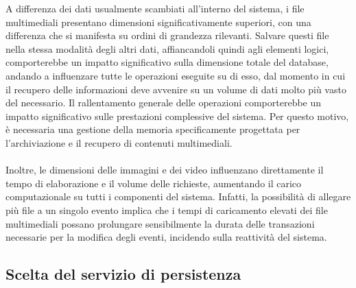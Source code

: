 A differenza dei dati usualmente scambiati all'interno del sistema, 
i file multimediali presentano dimensioni significativamente superiori, 
con una differenza che si manifesta su ordini di grandezza rilevanti. 
Salvare questi file nella stessa modalità degli altri dati, 
affiancandoli quindi agli elementi logici, 
comporterebbe un impatto significativo sulla dimensione totale del database,
andando a influenzare tutte le operazioni eseguite su di esso,
dal momento in cui il recupero delle informazioni deve avvenire
su un volume di dati molto più vasto del necessario.
Il rallentamento generale delle operazioni comporterebbe
un impatto significativo sulle prestazioni complessive del sistema.
Per questo motivo, è necessaria una gestione della memoria 
specificamente progettata per l'archiviazione e il recupero di contenuti multimediali.\\
\\
Inoltre, le dimensioni delle immagini e dei video influenzano direttamente 
il tempo di elaborazione e il volume delle richieste, 
aumentando il carico computazionale su tutti i componenti del sistema. 
Infatti, la possibilità di allegare più file a un singolo evento implica 
che i tempi di caricamento elevati dei file multimediali 
possano prolungare sensibilmente la durata delle transazioni
necessarie per la modifica degli eventi, 
incidendo sulla reattività del sistema.

\subsection{Scelta del servizio di persistenza}

